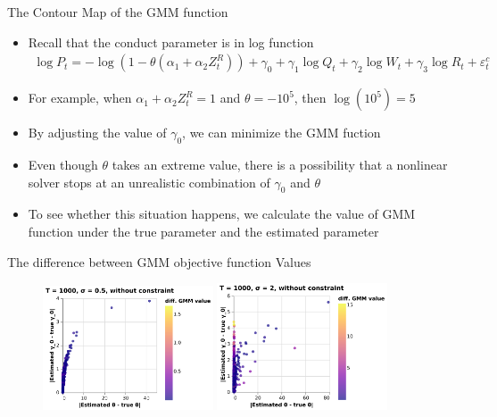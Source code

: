 \documentclass[aspectratio = 169]{beamer}
\theoremstyle{definition}
\begin{document}
\begin{frame}{The Contour Map of the GMM function}
    \begin{itemize}
        \item Recall that the conduct parameter is in log function
            \begin{align*}
                \log P_t = - \log(1 - \theta(\alpha_1 + \alpha_2 Z^{R}_{t})) + \gamma_0 + \gamma_1 \log Q_t +  \gamma_2 \log W_{t} + \gamma_3 \log R_t + \varepsilon^{c}_{t}
            \end{align*}
        \item For example, when $\alpha_1 + \alpha_2 Z^{R}_{t} = 1$ and $\theta = - 10^{5}$, then $\log(10^5) = 5$
        \item By adjusting the value of $\gamma_0$, we can minimize the GMM fuction
        \item Even though $\theta$ takes an extreme value, there is a possibility that a nonlinear solver stops at an unrealistic combination of $\gamma_0$ and $\theta$
        \item To see whether this situation happens, we calculate the value of GMM function under the true parameter and the estimated parameter
    \end{itemize}
\end{frame}

\begin{frame}{The difference between GMM objective function Values }
    \begin{figure}[!htbp]
  \begin{center}
  \includegraphics[width = 0.45\textwidth]
  {figuretable/diff_gmm_value_loglinear_loglinear_n_1000_sigma_0.5_non_constraint.pdf}
  \includegraphics[width = 0.45\textwidth]
  {figuretable/diff_gmm_value_loglinear_loglinear_n_1000_sigma_2_non_constraint.pdf}
  \label{fg:diff_gmm_loglinear_loglinear} 
  \end{center}
\end{figure} 
\end{frame}
\end{document}
